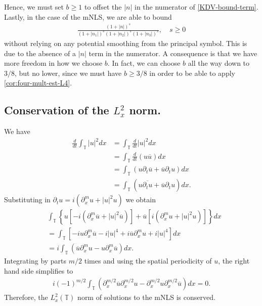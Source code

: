 \documentclass[12pt,reqno]{amsart}
\numberwithin{equation}{section}  %
\numberwithin{figure}{section}
\newcommand{\ci}{\mathbb{T}}
\newcommand{\p}{\partial}
\newcommand{\quod}{\qquad \qedsymbol}
\theoremstyle{plain}
\theoremstyle{definition}
\theoremstyle{remark}
\begin{document}
Hence, we must set $b \ge 1$ to offset the $|n|$ in the numerator of 
\eqref{KDV-bound-term}.
Lastly, in the case of the mNLS, we are able to bound 
\begin{equation*}
	\begin{split}
    \frac{\left (1 + |n| \right ) ^s}{\left (1 + |n_1| \right ) ^s \left (1 +
    |n_2| \right ) ^s \left (1 + |n_3| \right ) ^s}, \quad s \ge 0 
	\end{split}
\end{equation*}
without relying on any potential smoothing from the principal symbol.
This is due to the
absence of a $|n|$ term in the
numerator. A consequence is that we have more freedom in how
we choose $b$. In fact, we can choose $b$ all the way down to $3/8$, but no
lower, since we must have $b \ge 3/8$ in order to be able to apply
\autoref{cor:four-mult-est-L4}. 
%
%
\subsection{Conservation of the $L_x^2$ norm.} 
We have
%
%
\begin{equation*}
	\begin{split}
		\frac{d}{dt} \int_\ci | u |^2  dx
		& = \int_\ci \frac{d}{dt} | u |^2  dx
		\\
		& = \int_\ci \frac{d}{dt} \left( u \overline{u} \right)  dx
		\\
		& = \int_\ci \left( u \p_t \overline{u} + \overline{u} \p_t u \right) dx
		\\
		& = \int_\ci \left( u \overline{\p_t u} + \overline{u} \p_t u \right)dx.
	\end{split}
\end{equation*}
%
%
Substituting in $\p_t u = i\left( \p_x^{m} u + | u |^2 u \right)$ we obtain
%
%
\begin{equation*}
	\begin{split}
		& \int_{\ci} \left\{ u\left[ -i\left( \p_x^{m} \overline{u} + | u |^2
		\overline{u} \right) \right] + \overline{u}\left[ i\left( \p_x^{m} u + | u
		|^2 u \right) \right] \right\}dx
		\\
		& = \int_\ci \left[ -iu \p_x^{m} \overline{u} - i| u |^4 + i \overline{u}
		\p_x^{m} u + i | u |^4 \right]dx
		\\
		& = i \int_{\ci}\left( \overline{u} \p_x^{m} u - u \p_x^{m } \overline{u}
		\right)dx.
	\end{split}
\end{equation*}
%
%
Integrating by parts $m/2$ times and using
the spatial periodicity of $u$, the right
hand side simplifies to
%
%
\begin{equation*}
	\begin{split}
    i (-1)^{m/2}\int_\ci \left( \p_x^{m/2} \overline{u} \p_x^{m/2} u - \p_x^{m/2} u
		\p_x^{m/2 } 
		\overline{u} \right) dx = 0.
	\end{split}
\end{equation*}
%
%
Therefore, the $L_x^2(\ci)$ norm of solutions to the mNLS is conserved. \quod
\end{document}
